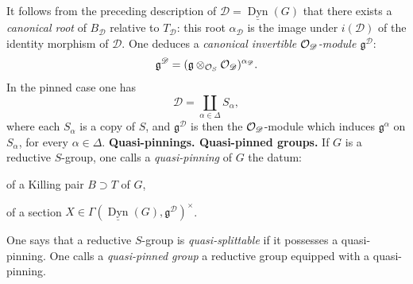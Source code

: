 It follows from the preceding description of $\mathscr D=\underline{\operatorname{Dyn}}(G)$ that there exists a \emph{canonical root} of $B_{\mathscr D}$ relative to $T_{\mathscr D}$: this root $\alpha_{\mathscr D}$ is the image under $i(\mathscr D)$ of the identity morphism of $\mathscr D$. One deduces a \emph{canonical invertible $\mathcal{O}_{\mathscr D}$-module $\mathfrak g^{\mathscr D}$}:
\[
\mathfrak g^{\mathscr D}=(\mathfrak g\otimes_{\mathcal{O}_S}\mathcal{O}_{\mathscr D})^{\alpha_{\mathscr D}}.
\]
In the pinned case one has
\[
\mathscr D=\coprod_{\alpha\in\Delta}S_\alpha,
\]
where each $S_\alpha$ is a copy of $S$, and $\mathfrak g^{\mathscr D}$ is then the $\mathcal{O}_{\mathscr D}$-module which induces $\mathfrak g^\alpha$ on $S_\alpha$, for every $\alpha\in\Delta$.
\label{XXIV.3.9}\textbf{Quasi-pinnings. Quasi-pinned groups.}
If $G$ is a reductive $S$-group, one calls a \emph{quasi-pinning} of $G$ the datum:
\begin{enumeratei}
\item of a Killing pair $B\supset T$ of $G$,
\item of a section $X\in\Gamma(\underline{\operatorname{Dyn}}(G),\mathfrak g^{\mathscr D})^\times$.
\end{enumeratei}
One says that a reductive $S$-group is \emph{quasi-splittable} if it possesses a quasi-pinning. One calls a \emph{quasi-pinned group} a reductive group equipped with a quasi-pinning.

